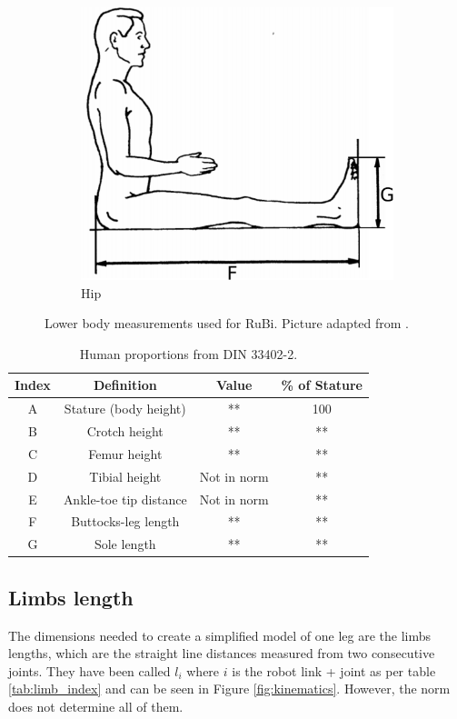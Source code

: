 \begin{figure}[htb]
\begin{subfigure}[b]{0.4\textwidth}
        \includegraphics[width=\textwidth]{figures/din_measurements2.pdf}
        \caption{Hip}
        \label{fig:din2}
    \end{subfigure}
	\caption{Lower body measurements used for RuBi. Picture adapted from \cite{din_measurements1}.}
	\label{fig:human_measurements}
\end{figure}


\begin{table}
\begin{center}
	\begin{tabular}{c | c | c | c}
	  Index & Definition & Value & \% of Stature \\
	  \hline
	  A & Stature (body height) & ** & 100 \\
	  B & Crotch height & ** & ** \\
	  C & Femur height & ** & ** \\
	  D & Tibial height & Not in norm & **\\
	  E & Ankle-toe tip distance & Not in norm & ** \\
	  F & Buttocks-leg length & ** & ** \\
	  G & Sole length & ** & **
	\end{tabular}
	\caption{Human proportions from DIN 33402-2.}
	\label{tab:din_proportions}
\end{center}
\end{table}

\subsection{Limbs length} %
\label{sub:limbs_lengths}
The dimensions needed to create a simplified model of one leg are the limbs lengths, which are the straight line distances measured from two consecutive joints.
They have been called $l_{i}$ where $i$ is the robot link + joint as per table \ref{tab:limb_index} and can be seen in Figure \ref{fig:kinematics}.
However, the norm does not determine all of them.

